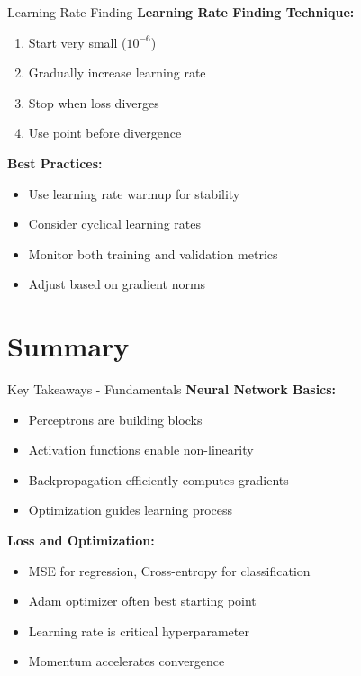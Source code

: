 \documentclass[aspectratio=169,10pt]{beamer}
\begin{document}
\begin{frame}{Learning Rate Finding}
\textbf{Learning Rate Finding Technique:}
\begin{enumerate}
\item Start very small ($10^{-6}$)
\item Gradually increase learning rate
\item Stop when loss diverges
\item Use point before divergence
\end{enumerate}

\textbf{Best Practices:}
\begin{itemize}
\item Use learning rate warmup for stability
\item Consider cyclical learning rates
\item Monitor both training and validation metrics
\item Adjust based on gradient norms
\end{itemize}
\end{frame}

\section{Summary}

\begin{frame}{Key Takeaways - Fundamentals}
\textbf{Neural Network Basics:}
\begin{itemize}
\item Perceptrons are building blocks
\item Activation functions enable non-linearity
\item Backpropagation efficiently computes gradients
\item Optimization guides learning process
\end{itemize}

\textbf{Loss and Optimization:}
\begin{itemize}
\item MSE for regression, Cross-entropy for classification
\item Adam optimizer often best starting point
\item Learning rate is critical hyperparameter
\item Momentum accelerates convergence
\end{itemize}
\end{frame}
\end{document}
